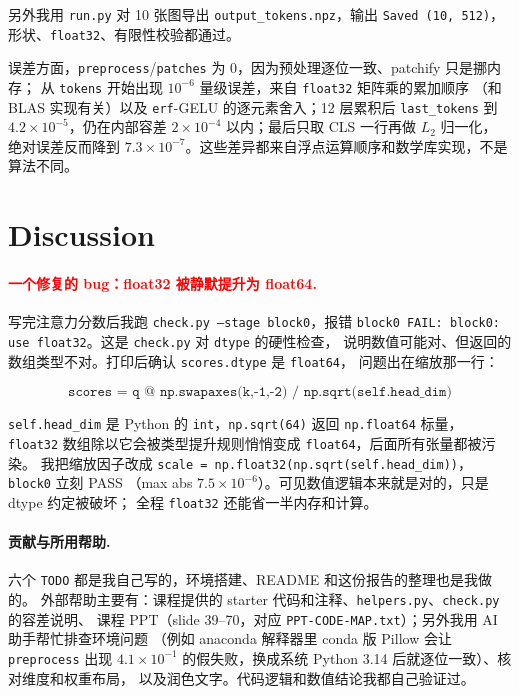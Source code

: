 \documentclass[a4paper,12pt]{article}
\newcommand{\mine}[1]{\textcolor{red}{#1}}
\begin{document}
另外我用 \texttt{run.py} 对 10 张图导出 \texttt{output\_tokens.npz}，输出
\texttt{Saved (10, 512)}，形状、\texttt{float32}、有限性校验都通过。

误差方面，\texttt{preprocess}/\texttt{patches} 为 0，因为预处理逐位一致、patchify 只是挪内存；
从 \texttt{tokens} 开始出现 $10^{-6}$ 量级误差，来自 \texttt{float32} 矩阵乘的累加顺序
（和 BLAS 实现有关）以及 \texttt{erf}-GELU 的逐元素舍入；12 层累积后 \texttt{last\_tokens}
到 $4.2\times10^{-5}$，仍在内部容差 $2\times10^{-4}$ 以内；最后只取 CLS 一行再做 $L_2$ 归一化，
绝对误差反而降到 $7.3\times10^{-7}$。这些差异都来自浮点运算顺序和数学库实现，不是算法不同。

\section{Discussion}

\paragraph{\mine{一个修复的 bug：float32 被静默提升为 float64.}}\label{sec:debug}
写完注意力分数后我跑 \texttt{check.py --stage block0}，报错
\texttt{block0 FAIL: block0: use float32}。这是 \texttt{check.py} 对 \texttt{dtype} 的硬性检查，
说明数值可能对、但返回的数组类型不对。打印后确认 \texttt{scores.dtype} 是 \texttt{float64}，
问题出在缩放那一行：

\[\texttt{scores = q @ np.swapaxes(k,-1,-2) / np.sqrt(self.head\_dim)}\]

\texttt{self.head\_dim} 是 Python 的 \texttt{int}，\texttt{np.sqrt(64)} 返回 \texttt{np.float64}
标量，\texttt{float32} 数组除以它会被类型提升规则悄悄变成 \texttt{float64}，后面所有张量都被污染。
我把缩放因子改成 \texttt{scale = np.float32(np.sqrt(self.head\_dim))}，\texttt{block0} 立刻 PASS
（max abs $7.5\times10^{-6}$）。可见数值逻辑本来就是对的，只是 dtype 约定被破坏；
全程 \texttt{float32} 还能省一半内存和计算。

\paragraph{贡献与所用帮助.}
六个 \texttt{TODO} 都是我自己写的，环境搭建、README 和这份报告的整理也是我做的。
外部帮助主要有：课程提供的 starter 代码和注释、\texttt{helpers.py}、\texttt{check.py} 的容差说明、
课程 PPT（slide 39--70，对应 \texttt{PPT-CODE-MAP.txt}）；另外我用 AI 助手帮忙排查环境问题
（例如 anaconda 解释器里 conda 版 Pillow 会让 \texttt{preprocess} 出现
$4.1\times10^{-1}$ 的假失败，换成系统 Python 3.14 后就逐位一致）、核对维度和权重布局，
以及润色文字。代码逻辑和数值结论我都自己验证过。
\end{document}
